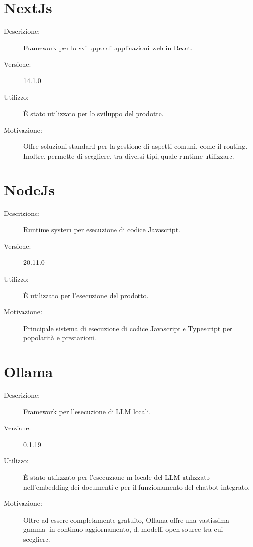 \section{NextJs}
\begin{description}
\item[Descrizione:] Framework per lo sviluppo di applicazioni web in React.
\item[Versione:] 14.1.0
\item[Utilizzo:] È stato utilizzato per lo sviluppo del prodotto.
\item[Motivazione:] Offre soluzioni standard per la gestione di aspetti comuni, come il routing. Inoltre, permette di scegliere, tra diversi tipi, quale runtime utilizzare.
\end{description}

\section{NodeJs}
\begin{description}
\item[Descrizione:] Runtime system per esecuzione di codice Javascript.
\item[Versione:] 20.11.0
\item[Utilizzo:] È utilizzato per l'esecuzione del prodotto.
\item[Motivazione:] Principale sistema di esecuzione di codice Javascript e Typescript per popolarità e prestazioni.
\end{description}

\section{Ollama}
\begin{description}
\item[Descrizione:] Framework per l'esecuzione di LLM locali.
\item[Versione:] 0.1.19
\item[Utilizzo:] È stato utilizzato per l'esecuzione in locale del LLM utilizzato nell'embedding dei documenti e per il funzionamento del chatbot integrato.
\item[Motivazione:] Oltre ad essere completamente gratuito, Ollama offre una vastissima gamma, in continuo aggiornamento, di modelli open source tra cui scegliere.
\end{description}

